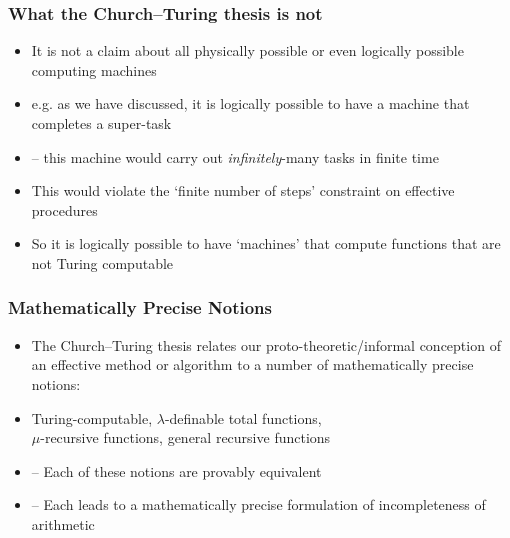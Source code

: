 \begin{frame}
\frametitle{What the Church--Turing thesis is not}

\begin{itemize}[<+->]

\item It is not a claim about all physically possible or even logically possible computing machines

\item e.g. as we have discussed, it is logically possible to have a machine that completes a super-task

\item[] -- this machine would carry out \textit{infinitely}-many tasks in finite time 

\item This would violate the `finite number of steps' constraint on effective procedures
%

\item So it is logically possible to have `machines' that compute functions that are not Turing computable 


\end{itemize}
\end{frame}

\begin{frame}
\frametitle{Mathematically Precise Notions}

\begin{itemize}[<+->]

\item The Church--Turing thesis relates our proto-theoretic/informal conception of an effective method or algorithm to a number of mathematically precise notions:

\item Turing-computable, $\lambda$-definable total functions, \\ $\mu$-recursive functions, general recursive functions

\item[] -- Each of these notions are provably equivalent 

\item[] -- Each leads to a mathematically precise formulation of incompleteness of arithmetic

\end{itemize}
\end{frame}





